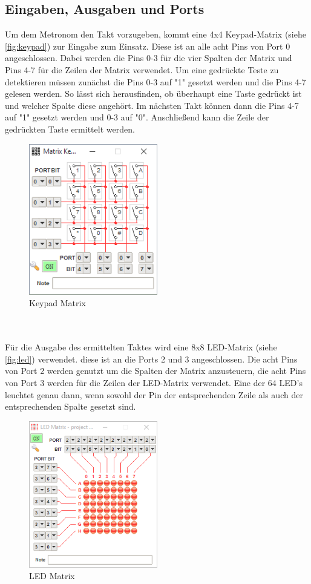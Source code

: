 \documentclass[a4paper, 12pt]{scrartcl}
\begin{document}
\subsection{Eingaben, Ausgaben und Ports}
Um dem Metronom den Takt vorzugeben, kommt eine 4x4 Keypad-Matrix (siehe \autoref{fig:keypad}) zur Eingabe zum Einsatz. Diese ist an alle acht Pins von Port 0 angeschlossen. Dabei werden die Pins 0-3 für die vier Spalten der Matrix und Pins 4-7 für die Zeilen der Matrix verwendet. Um eine gedrückte Teste zu detektieren müssen zunächst die Pins 0-3 auf "1" gesetzt werden und die Pins 4-7 gelesen werden. So lässt sich herausfinden, ob überhaupt eine Taste gedrückt ist und welcher Spalte diese angehört. Im nächsten Takt können dann die Pins 4-7 auf "1" gesetzt werden und 0-3 auf "0". Anschließend kann die Zeile der gedrückten Taste ermittelt werden.
\begin{figure}[h]
\centering
\includegraphics[width=0.5\textwidth]{keypad.png}
\caption{Keypad Matrix}
\label{fig:keypad}
\end{figure}
\\
\\
Für die Ausgabe des ermittelten Taktes wird eine 8x8 LED-Matrix (siehe \autoref{fig:led}) verwendet. diese ist an die Ports 2 und 3 angeschlossen. Die acht Pins von Port 2 werden genutzt um die Spalten der Matrix anzusteuern, die acht Pins von Port 3 werden für die Zeilen der LED-Matrix verwendet. Eine der 64 LED's leuchtet genau dann, wenn sowohl der Pin der entsprechenden Zeile als auch der entsprechenden Spalte gesetzt sind.
\begin{figure}[h]
\centering
\includegraphics[width=0.5\textwidth]{led.png}
\caption{LED Matrix}
\label{fig:led}
\end{figure}
\end{document}

